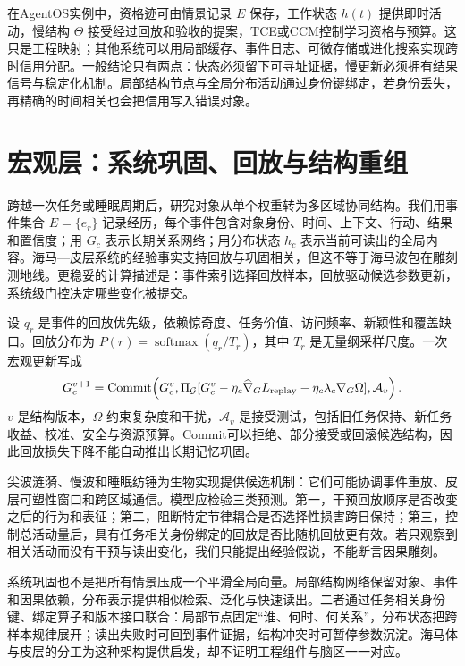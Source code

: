 在AgentOS实例中，资格迹可由情景记录 $E$ 保存，工作状态 $h(t)$ 提供即时活动，慢结构 $\Theta$ 接受经过回放和验收的提案，TCE或CCM控制学习资格与预算。这只是工程映射；其他系统可以用局部缓存、事件日志、可微存储或进化搜索实现跨时信用分配。一般结论只有两点：快态必须留下可寻址证据，慢更新必须拥有结果信号与稳定化机制。局部结构节点与全局分布活动通过身份键绑定，若身份丢失，再精确的时间相关也会把信用写入错误对象。

\section{宏观层：系统巩固、回放与结构重组}
\label{sec:macro_cortical_metric_flow_and_consolidation}

跨越一次任务或睡眠周期后，研究对象从单个权重转为多区域协同结构。我们用事件集合 $E=\{e_r\}$ 记录经历，每个事件包含对象身份、时间、上下文、行动、结果和置信度；用 $G_c$ 表示长期关系网络；用分布状态 $h_c$ 表示当前可读出的全局内容。海马—皮层系统的经验事实支持回放与巩固相关，但这不等于海马波包在雕刻测地线。更稳妥的计算描述是：事件索引选择回放样本，回放驱动候选参数更新，系统级门控决定哪些变化被提交。

设 $q_r$ 是事件的回放优先级，依赖惊奇度、任务价值、访问频率、新颖性和覆盖缺口。回放分布为 $P(r)=\operatorname{softmax}(q_r/T_r)$，其中 $T_r$ 是无量纲采样尺度。一次宏观更新写成
\begin{equation}
G_c^{v+1}=\operatorname{Commit}\!\left(G_c^v,\Pi_{\mathcal G}[G_c^v-\eta_c\widehat\nabla_GL_{\rm replay}-\eta_c\lambda_c\nabla_G\Omega],\mathcal A_v\right).
\end{equation}
$v$ 是结构版本，$\Omega$ 约束复杂度和干扰，$\mathcal A_v$ 是接受测试，包括旧任务保持、新任务收益、校准、安全与资源预算。Commit可以拒绝、部分接受或回滚候选结构，因此回放损失下降不能自动推出长期记忆巩固。

尖波涟漪、慢波和睡眠纺锤为生物实现提供候选机制：它们可能协调事件重放、皮层可塑性窗口和跨区域通信。模型应检验三类预测。第一，干预回放顺序是否改变之后的行为和表征；第二，阻断特定节律耦合是否选择性损害跨日保持；第三，控制总活动量后，具有任务相关身份绑定的回放是否比随机回放更有效。若只观察到相关活动而没有干预与读出变化，我们只能提出经验假说，不能断言因果雕刻。

系统巩固也不是把所有情景压成一个平滑全局向量。局部结构网络保留对象、事件和因果依赖，分布表示提供相似检索、泛化与快速读出。二者通过任务相关身份键、绑定算子和版本接口联合：局部节点固定“谁、何时、何关系”，分布状态把跨样本规律展开；读出失败时可回到事件证据，结构冲突时可暂停参数沉淀。海马体与皮层的分工为这种架构提供启发，却不证明工程组件与脑区一一对应。

